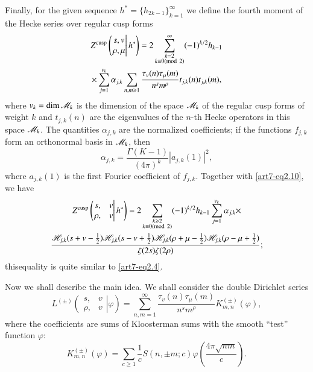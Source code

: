 Finally, for the given sequence $h^\ast =\{h_{2k-1}\}^\infty_{k=1}$ we define the fourth moment of the Hecke series over regular cusp forms 
\begin{gather}
Z^{\text{cusp}} \left(
\left.
\begin{matrix}
s, v\\
\rho, \mu
\end{matrix}
\right| h^\ast
\right)  =  2 \sum\limits^\infty_{\substack{k=2\\k \equiv 0 (\mod 2)}} (-1)^{k/2} h_{k-1} \label{art7-eq2.10}\\
\times \sum\limits^{v_k}_{j=1} \alpha_{j,k} \sum\limits_{n, m\geqslant 1} \frac{\tau_v (n) \tau_\mu (m)}{n^s m^\rho} t_{j,k} (n) t_{j,k} (m), \notag
\end{gather}
where $v_k =\dim \sM_k$ is the dimension of the space $\sM_k$ of the regular cusp forms of weight $k$ and $t_{j,k} (n)$ are the eigenvalues of the $n$-th Hecke operators in this space $\sM_k$. The quantities $\alpha_{j,k}$ are the normalized coefficients; if the functions $f_{j,k}$ form an orthonormal basis in $\sM_k$, then 
\begin{equation}
\alpha_{j,k} = \frac{\Gamma (K-1)}{(4\pi)^k} |a_{j,k} (1)|^2, \label{art7-eq2.11}
\end{equation}
where $a_{j, k} (1)$ is the first Fourier coefficient of $f_{j,k}$. Together with \eqref{art7-eq2.10}, we have 
\begin{gather}
Z^{\text{cusp}} 
\left(\left.
\begin{matrix}
s, & v \\
\rho,& v
\end{matrix}
\right|h^\ast\right) = 2 \sum\limits_{\substack{k\geqslant 2\\ k \equiv 0 (\mod 2)}} (-1)^{k/2} h_{k-1} \sum\limits^{v_k}_{j=1} \alpha_{j, k} \times \label{art7-eq2.12}\\
\frac{\sH_{j,k} (s+v -\frac{1}{2}) \sH_{j,k} (s-v+\frac{1}{2}) \sH_{j,k} (\rho + \mu - \frac{1}{2}) \sH_{j,k} (\rho-\mu +\frac{1}{2})}{\zeta(2s) \zeta (2\rho)} ; \notag
\end{gather}
this\pageoriginale equality is quite similar to \eqref{art7-eq2.4}.

Now we shall describe the main idea. We shall consider the double Dirichlet series 
\begin{equation}
L^{(\pm)} 
\left(\left.
\begin{matrix}
s, & v \\
\rho,& v
\end{matrix}
\right|\varphi\right)  = \sum\limits^{\infty}_{n,m =1} \frac{\tau_v (n) \tau_\mu (m)}{n^s m^\rho} K^{(\pm)}_{m,n} (\varphi), \label{art7-eq2.13}
\end{equation}
where the coefficients are sums of Kloosterman sums with the smooth ``test'' function $\varphi$:
\begin{equation}
K^{(\pm)}_{m,n} (\varphi) = \sum\limits_{c \geqslant 1 } \frac{1}{c} S (n, \pm m; c) \varphi \left(\frac{4\pi \sqrt{nm}}{c} \right) . 
\label{art7-eq2.14}
\end{equation}


